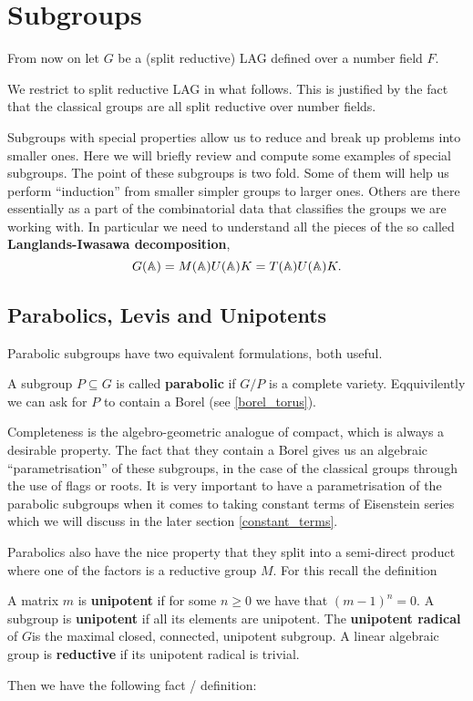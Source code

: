 \section{Subgroups}
From now on let \(G\) be a (split reductive) LAG defined over a number field \(F\).
\begin{remark}
    We restrict to split reductive LAG in what follows. This is justified by the fact that the classical groups are all split reductive over number fields.  
\end{remark}

Subgroups with special properties allow us to reduce and break up problems into smaller ones. Here we will briefly review and compute some examples of special subgroups. The point of these subgroups is two fold. Some of them will help us perform ``induction'' from smaller simpler groups to larger ones. Others are there essentially as a part of the combinatorial data that classifies the groups we are working with. In particular we need to understand all the pieces of the so called \textbf{Langlands-Iwasawa decomposition},
\begin{equation}\label{eq:iwasawa_decomposition}
    G(\A) = M(\A)U(\A) K = T(\A)U(\A)K.
\end{equation}

\subsection{Parabolics, Levis and Unipotents}
Parabolic subgroups have two equivalent formulations, both useful.
\begin{definition}
    A subgroup \(P\subseteq G\) is called \textbf{parabolic} if \(G/P\) is a complete variety. Eqquivilently we can ask for \(P\) to contain a Borel (see \ref{borel_torus}).
\end{definition}

Completeness is the algebro-geometric analogue of compact, which is always a desirable property. The fact that they contain a Borel gives us an algebraic ``parametrisation'' of these subgroups, in the case of the classical groups through the use of flags or roots. It is very important to have a parametrisation of the parabolic subgroups when it comes to taking constant terms of Eisenstein series which we will discuss in the later section \ref{constant_terms}.

Parabolics also have the nice property that they split into a semi-direct product 
where one of the factors is a reductive group \(M\). For this recall the definition
\begin{definition}\label{unipotent_radical_definition}
    A matrix \(m\) is \textbf{unipotent} if for some \(n\geq 0\) we have that \((m-1)^n = 0\). A subgroup is \textbf{unipotent} if all its elements are unipotent. The \textbf{unipotent radical} of \(G\)is the maximal closed, connected, unipotent subgroup. A linear algebraic group is \textbf{reductive} if its unipotent radical is trivial.
\end{definition}
Then we have the following fact / definition:

